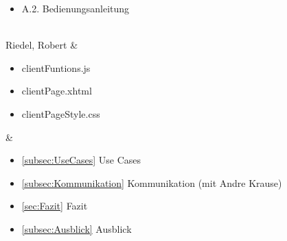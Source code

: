 \begin{table}[H]
\begin{tabu}
\begin{itemize}
		\item A.2. Bedienungsanleitung
\end{itemize}\\ \hline
		Riedel, Robert & \begin{itemize}
		\itemsep 0pt
		\item clientFuntions.js
		\item clientPage.xhtml
		\item clientPageStyle.css
\end{itemize} & \begin{itemize}
		\itemsep 0pt
		\item \ref{subsec:UseCases} Use Cases
		\item \ref{subsec:Kommunikation} Kommunikation (mit Andre Krause)
		\item \ref{sec:Fazit} Fazit
		\item \ref{subsec:Ausblick} Ausblick
\end{itemize}\\
	\end{tabu}
\end{table}